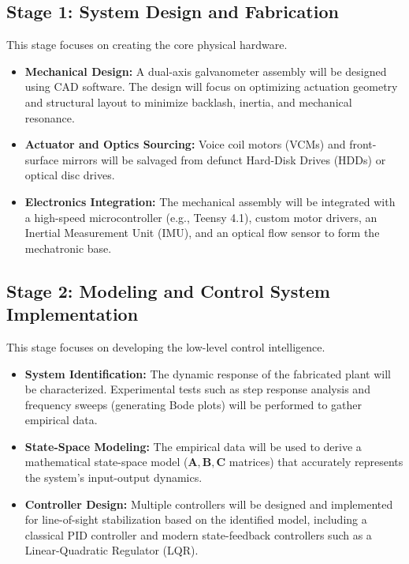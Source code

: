 \documentclass[12pt]{article}
\begin{document}
\subsection{Stage 1: System Design and Fabrication}
This stage focuses on creating the core physical hardware.
\begin{itemize}
    \item \textbf{Mechanical Design:} A dual-axis galvanometer assembly will be designed using CAD software. The design will focus on optimizing actuation geometry and structural layout to minimize backlash, inertia, and mechanical resonance.
    \item \textbf{Actuator and Optics Sourcing:} Voice coil motors (VCMs) and front-surface mirrors will be salvaged from defunct Hard-Disk Drives (HDDs) or optical disc drives.
    \item \textbf{Electronics Integration:} The mechanical assembly will be integrated with a high-speed microcontroller (e.g., Teensy 4.1), custom motor drivers, an Inertial Measurement Unit (IMU), and an optical flow sensor to form the mechatronic base.
\end{itemize}

\subsection{Stage 2: Modeling and Control System Implementation}
This stage focuses on developing the low-level control intelligence.
\begin{itemize}
    \item \textbf{System Identification:} The dynamic response of the fabricated plant will be characterized. Experimental tests such as step response analysis and frequency sweeps (generating Bode plots) will be performed to gather empirical data.
    \item \textbf{State-Space Modeling:} The empirical data will be used to derive a mathematical state-space model (\(\mathbf{A, B, C}\) matrices) that accurately represents the system's input-output dynamics.
    \item \textbf{Controller Design:} Multiple controllers will be designed and implemented for line-of-sight stabilization based on the identified model, including a classical PID controller and modern state-feedback controllers such as a Linear-Quadratic Regulator (LQR).
\end{itemize}
\end{document}
